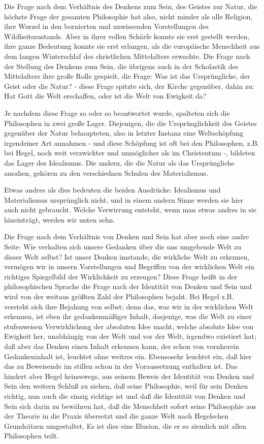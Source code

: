 Die Frage nach dem Verhältnis des Denkens zum Sein, des Geistes
zur Natur, die höchste Frage der gesamten Philosophie hat also, nicht
minder als alle Religion, ihre Wurzel in den bornierten und unwissenden
Vorstellungen des Wildheitszustands. Aber in ihrer vollen Schärfe konnte
sie erst gestellt werden, ihre ganze Bedeutung konnte sie erst erlangen,
als die europäische Menschheit aus dem langen Winterschlaf des
christlichen Mittelalters erwachte. Die Frage nach der Stellung des
Denkens zum Sein, die übrigens auch in der Scholastik des Mittelalters
ihre große Rolle gespielt, die Frage: Was ist das Ursprüngliche, der
Geist oder die Natur? - diese Frage spitzte sich, der Kirche gegenüber,
dahin zu: Hat Gott die Welt erschaffen, oder ist die Welt von Ewigkeit
da?

Je nachdem diese Frage so oder so beantwortet wurde, spalteten
sich die Philosophen in zwei große Lager. Diejenigen, die die
Ursprünglichkeit des Geistes gegenüber der Natur behaupteten, also in
letzter Instanz eine Weltschöpfung irgendeiner Art annahmen - und diese
Schöpfung ist oft bei den Philosophen, z.B. bei Hegel, noch weit
verzwickter und unmöglicher als im Christentum -, bildeten das Lager des
Idealismus. Die andern, die die Natur als das Ursprüngliche ansahen,
gehören zu den verschiednen Schulen des Materialismus.

Etwas andres als dies bedeuten die beiden Ausdrücke: Idealismus
und Materialismus ursprünglich nicht, und in einem andern Sinne werden
sie hier auch nicht gebraucht. Welche Verwirrung entsteht, wenn man
etwas andres in sie hineinträgt, werden wir unten sehn.

Die Frage nach dem Verhältnis von Denken und Sein hat aber noch
eine andre Seite: Wie verhalten sich unsere Gedanken über die uns
umgebende Welt zu dieser Welt selbst? Ist unser Denken imstande, die
wirkliche Welt zu erkennen, vermögen wir in unsern Vorstellungen und
Begriffen von der wirklichen Welt ein richtiges Spiegelbild der
Wirklichkeit zu erzeugen? Diese Frage heißt in der philosophischen
Sprache die Frage nach der Identität von Denken und Sein und wird von
der weitaus größten Zahl der Philosophen bejaht. Bei Hegel z.B. versteht
sich ihre Bejahung von selbst; denn das, was wir in der wirklichen Welt
erkennen, ist eben ihr gedankenmäßiger Inhalt, dasjenige, was die Welt
zu einer stufenweisen Verwirklichung der absoluten Idee macht, welche
absolute Idee von Ewigkeit her, unabhängig von der Welt und vor der
Welt, irgendwo existiert hat; daß aber das Denken einen Inhalt erkennen
kann, der schon von vornherein Gedankeninhalt ist, leuchtet ohne weitres
ein. Ebensosehr leuchtet ein, daß hier das zu Beweisende im stillen
schon in der Voraussetzung enthalten ist. Das hindert aber Hegel
keineswegs, aus seinem Beweis der Identität von Denken und Sein den
weitern Schluß zu ziehen, daß seine Philosophie, weil für sein Denken
richtig, nun auch die einzig richtige ist und daß die Identität von
Denken und Sein sich darin zu bewähren hat, daß die Menschheit sofort
seine Philosophie aus der Theorie in die Praxis übersetzt und die ganze
Welt nach Hegelschen Grundsätzen umgestaltet. Es ist dies eine Illusion,
die er so ziemlich mit allen Philosophen teilt.

